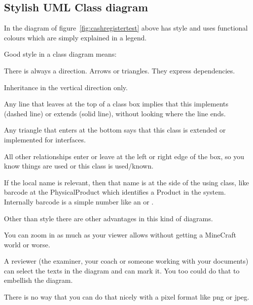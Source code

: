 \subsection{Stylish UML Class diagram}
\label{sec:stylish}
In the diagram of figure~\vref{fig:cashregistertest} above has style and uses functional colours which are simply explained in a legend.

Good style in a class diagram means:
\begin{Itemize}
\item There is always a direction. Arrows or triangles. They express dependencies.
\item Inheritance in the vertical direction only.
  \begin{Itemize}
    \item Any line that leaves at the top of a class box implies that this
      implements (dashed line) or extends (solid line), without looking where the line ends.
    \item Any triangle that enters at the bottom says that this class is extended or implemented for interfaces.
  \end{Itemize}
  \item All other relationships enter or leave at the left or right edge of the box, so you know things are used
  or this class is used/known.
  \begin{Itemize}
  \item If the local name is relevant, then that name is at the side of the using class, like barcode at the PhysicalProduct which identifies a Product in the system. Internally barcode is a simple number like an  or .
  \end{Itemize}
\end{Itemize}

Other than style there are other advantages in this kind of diagrams.
\begin{Itemize}
\item You can zoom in as much as your viewer allows without getting a MineCraft world or worse.
\item A reviewer (the examiner, your coach or someone working with your documents) can select the texts in the diagram and can mark it. You too could do that to embellish the diagram.
\item There is no way that you can do that nicely with a pixel format like png or jpeg.
\end{Itemize}

